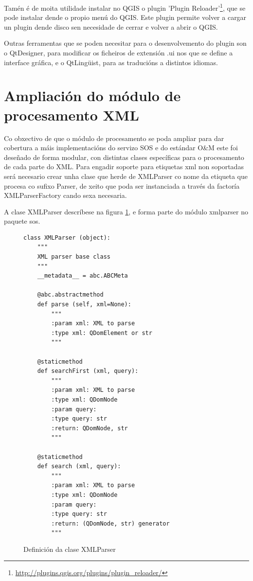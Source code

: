 Tamén é de moita utilidade instalar no QGIS o plugin 'Plugin Reloader'\footnote{\url{http://plugins.qgis.org/plugins/plugin_reloader/}}, que se pode instalar dende o propio menú do QGIS. Este plugin permite volver a cargar un plugin dende disco sen necesidade de cerrar e volver a abrir o QGIS.

Outras ferramentas que se poden necesitar para o desenvolvemento do plugin son o QtDesigner, para modificar os ficheiros de extensión .ui nos que se define a interface gráfica, e o QtLingüist, para as traducións a distintos idiomas.

\section{Ampliación do módulo de procesamento XML}
Co obxectivo de que o módulo de procesamento se poda ampliar para dar cobertura a máis implementacións do servizo SOS e do estándar O\&M este foi deseñado de forma modular, con distintas clases específicas para o procesamento de cada parte do XML. Para engadir soporte para etiquetas xml non soportadas será necesario crear unha clase que herde de XMLParser co nome da etiqueta que procesa co sufixo Parser, de xeito que poda ser instanciada a través da factoría XMLParserFactory cando sexa necesaria.

A clase XMLParser descríbese na figura \ref{fig:xmlparser}, e forma parte do módulo xmlparser no paquete sos.

\begin{figure}[H]
\centering
\begin{verbatim}
class XMLParser (object):
    """
    XML parser base class
    """
    __metadata__ = abc.ABCMeta

    @abc.abstractmethod
    def parse (self, xml=None):
        """
        :param xml: XML to parse
        :type xml: QDomElement or str
        """
    
    @staticmethod
    def searchFirst (xml, query):
        """
        :param xml: XML to parse
        :type xml: QDomNode
        :param query: 
        :type query: str
        :return: QDomNode, str
        """

    @staticmethod
    def search (xml, query):
        """
        :param xml: XML to parse
        :type xml: QDomNode
        :param query: 
        :type query: str
        :return: (QDomNode, str) generator
        """
\end{verbatim}
\caption{Definición da clase XMLParser}
\label{fig:xmlparser} 
\end{figure}

